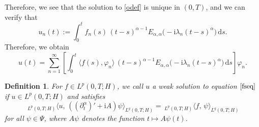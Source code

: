 \documentclass[reqno]{amsart}
\newtheorem{defn}[theorem]{Definition}
\numberwithin{equation}{section}
\def \d {\mathrm{d}}
\begin{document}
Therefore, we see that the solution to \eqref{odef} is unique in $(0,T)$, and we can verify that
$$u_n(t):=\int_0^t f_n(s)\,(t-s)^{\alpha-1}E_{\alpha,\alpha}\big(-\mathrm{i}\lambda_n (t-s)^\alpha\big)\,\d s.$$
Therefore, we obtain
\begin{equation}\label{solf}
u(t)=\sum_{n=1}^\infty \left[\int_0^t \langle f(s),\varphi_n\rangle\,(t-s)^{\alpha-1}E_{\alpha,\alpha}\big(-\mathrm{i}\lambda_n (t-s)^\alpha\big)\,\d s \right] \varphi_n.
\end{equation}

\begin{defn}
For $f\in L^p(0,T;H)$, we call $u$ a weak solution to equation $\eqref{fseq}$ if $u\in L^p(0,T;H)$ and satisfies
\begin{equation}\label{weaks}
 \, _{L^p(0,T;H)}\langle u, \, ((\partial_t^\alpha)' +\mathrm{i} A)\psi \rangle_{L^{q}(0,T;H)}
= \, _{L^p(0,T;H)}\langle f,\, \psi \rangle_{L^{q}(0,T;H)}
\end{equation}
for all $\psi \in \Psi$, where $A\psi$ denotes the function $t\mapsto A\psi(t)$.
\end{defn}
\end{document}

